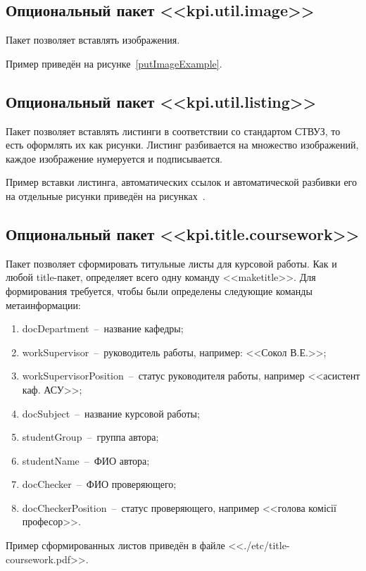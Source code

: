\subsection{Опциональный пакет <<kpi.util.image>>}
	Пакет позволяет вставлять изображения.\par
	Пример приведён на рисунке~\ref{putImageExample}.
\subsection{Опциональный пакет <<kpi.util.listing>>}
	Пакет позволяет вставлять листинги в соответствии со стандартом СТВУЗ, то есть оформлять их как рисунки. Листинг разбивается на множество изображений, каждое изображение нумеруется и подписывается.\par
	Пример вставки листинга, автоматических ссылок и автоматической разбивки его на отдельные рисунки приведён на рисунках~.
\subsection{Опциональный пакет <<kpi.title.coursework>>}
	Пакет позволяет сформировать титульные листы для курсовой работы. Как и любой title-пакет, определяет всего одну команду <<maketitle>>. Для формирования требуется, чтобы были определены следующие команды метаинформации: 
	\begin{enumerate}
	\item docDepartment~--~название кафедры;
	\item workSupervisor~--~руководитель работы, например: <<Сокол В.Е.>>;
	\item workSupervisorPosition~--~статус руководителя работы, например <<асистент каф. АСУ>>;
	\item docSubject~--~название курсовой работы;
	\item studentGroup~--~группа автора;
	\item studentName~--~ФИО автора;
	\item docChecker~--~ФИО проверяющего;
	\item docCheckerPosition~--~статус проверяющего, например <<голова комісії професор>>.	
	\end{enumerate}
	Пример сформированных листов приведён в файле <<./etc/title-coursework.pdf>>.